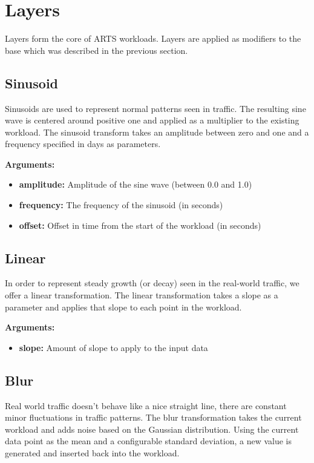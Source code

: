 \section{Layers}
Layers form the core of ARTS workloads. Layers are applied as modifiers to the base which was described in the previous section.

\subsection{Sinusoid}
Sinusoids are used to represent normal patterns seen in traffic. The resulting sine wave is centered around positive one and applied as a multiplier to the existing workload. The sinusoid transform takes an amplitude between zero and one and a frequency specified in days as parameters.

\textbf{Arguments:}
\begin{itemize}
\item \textbf{amplitude:} Amplitude of the sine wave (between 0.0 and 1.0)
\item \textbf{frequency:} The frequency of the sinusoid (in seconds)
\item \textbf{offset:} Offset in time from the start of the workload (in seconds)
\end{itemize}

\subsection{Linear}
In order to represent steady growth (or decay) seen in the real-world traffic, we offer a linear transformation. The linear transformation takes a slope as a parameter and applies that slope to each point in the workload.

\textbf{Arguments:}
\begin{itemize}
\item \textbf{slope:} Amount of slope to apply to the input data
\end{itemize}

\subsection{Blur}
Real world traffic doesn't behave like a nice straight line, there are constant minor fluctuations in traffic patterns. The blur transformation takes the current workload and adds noise based on the Gaussian distribution. Using the current data point as the mean and a configurable standard deviation, a new value is generated and inserted back into the workload.

